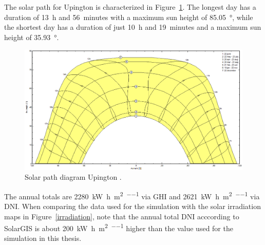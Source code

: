 The solar path for Upington is characterized in Figure~\ref{SunPathUpington}. The longest day has a duration of \SI{13}{h} and \SI{56}{minutes} with a maximum sun height of \SI{85.05}{\degree}, while the shortest day has a duration of just \SI{10}{h} and \SI{19}{minutes} and a maximum sun height of \SI{35.93}{\degree}.

\begin{figure}[htbp]  
\centering
\includegraphics[width=0.85\linewidth]{FIG/SunPathUpington}
\caption[Solar path diagram for Upington.]{Solar path diagram Upington \cite{PVsystSA2015}.}\label{SunPathUpington}
\end{figure}


The annual totals are \SI{2280}{\kilo\watt\hour\per\square\metre\per\year} via \ac{GHI} and \SI{2621}{\kilo\watt\hour\per\square\metre\per\year} via \ac{DNI}. When comparing the data used for the simulation with the solar irradiation maps in Figure~\ref{irradiation}, note that the annual total \ac{DNI} acccording to SolarGIS \cite{SolarGIS2015b} is about \SI{200}{\kilo\watt\hour\per\square\metre\per\year} higher than the value used for the simulation in this thesis.

